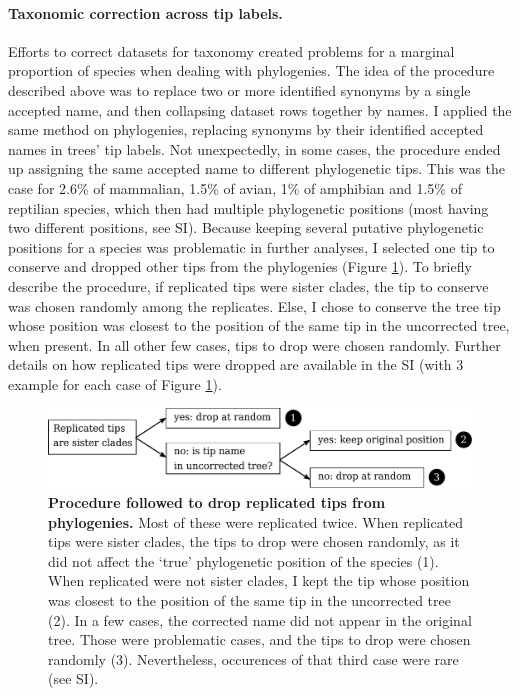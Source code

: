 \paragraph{Taxonomic correction across tip labels.} 
Efforts to correct datasets for taxonomy created problems for a marginal proportion of species when dealing with phylogenies. The idea of the procedure described above was to replace two or more identified synonyms by a single accepted name, and then collapsing dataset rows together by names. I applied the same method on phylogenies, replacing synonyms by their identified accepted names in trees' tip labels. Not unexpectedly, in some cases, the procedure ended up assigning the same accepted name to different phylogenetic tips. This was the case for 2.6\% of mammalian, 1.5\% of avian, 1\% of amphibian and  1.5\% of reptilian species, which then had multiple phylogenetic positions (most having two different positions, see SI). Because keeping several putative phylogenetic positions for a species was problematic in further analyses, I selected one tip to conserve and dropped other tips from the phylogenies (Figure \ref{chart_phylorep}). To briefly describe the procedure, if replicated tips were sister clades, the tip to conserve was chosen randomly among the replicates. Else, I chose to conserve the tree tip whose position was closest to the position of the same tip in the uncorrected tree, when present. In all other few cases, tips to drop were chosen randomly. Further details on how replicated tips were dropped are available in the SI (with 3 example for each case of Figure \ref{chart_phylorep}).

\begin{figure}[h!]
\centering
\includegraphics[scale=0.7]{figures/chapter2/chart_phylorep}
\caption[Procedure followed to drop replicated tips from phylogenies]{\textbf{Procedure followed to drop replicated tips from phylogenies.} Most of these were replicated twice. When replicated tips were sister clades, the tips to drop were chosen randomly, as it did not affect the `true' phylogenetic position of the species (1). When replicated were not sister clades, I kept the tip whose position was closest to the position of the same tip in the uncorrected tree (2). In a few cases, the corrected name did not appear in the original tree. Those were problematic cases, and the tips to drop were chosen randomly (3). Nevertheless, occurences of that third case were rare (see SI).}
\label{chart_phylorep}
\end{figure}

